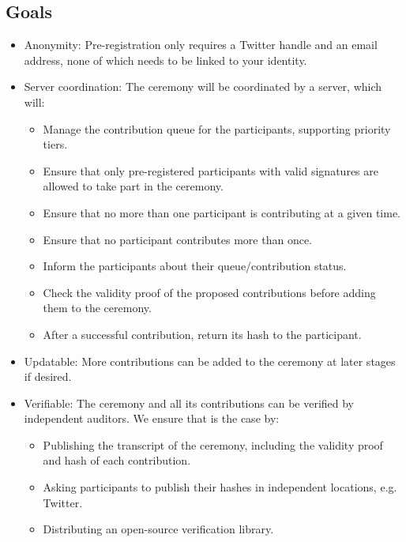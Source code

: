 
\subsection{Goals}

\begin{itemize}
    \item Anonymity: Pre-registration only requires a Twitter handle and an email address, none of which needs to be linked to your identity.
    \item Server coordination: The ceremony will be coordinated by a server, which will: \begin{itemize}
        \item Manage the contribution queue for the participants, supporting priority tiers.
        \item Ensure that only pre-registered participants with valid signatures are allowed to take part in the ceremony.
        \item Ensure that no more than one participant is contributing at a given time.
        \item Ensure that no participant contributes more than once.
        \item Inform the participants about their queue/contribution status. 
        \item Check the validity proof of the proposed contributions before adding them to the ceremony.
        \item After a successful contribution, return its hash to the participant.
    \end{itemize}
    \item Updatable: More contributions can be added to the ceremony at later stages if desired.
    \item Verifiable: The ceremony and all its contributions can be verified by independent auditors. We ensure that is the case by:
    \begin{itemize}
        \item Publishing the transcript of the ceremony, including the validity proof and hash of each contribution.
        \item Asking participants to publish their hashes in independent locations, e.g. Twitter.
        \item Distributing an open-source verification library. 
    \end{itemize}
\end{itemize}

